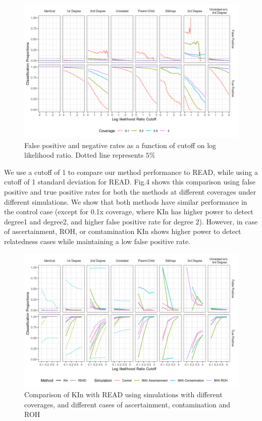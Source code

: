 \documentclass[12pt, letterpaper]{article}
\begin{document}
\begin{figure}[htp]
    \centering
    \includegraphics[width=18cm]{plots/plotimg/contam0_inbred0_model_performance_allroc_asc0_plot.png}
    \caption{False positive and negative rates as a function of cutoff on log likelihood ratio. Dotted line represents $5\%$}
    \label{fig3}
\end{figure}

We use a cutoff of 1 to compare our method performance to READ, while using a cutoff of 1 standard deviation for READ. Fig.4 shows this comparison using false positive and true positive rates for both the methods at different coverages under different simulations. We show that both methods have similar performance in the control case (except for 0.1x coverage, where KIn has higher power to detect degree1 and degree2, and higher false positive rate for degree 2). However, in case of ascertainment, ROH, or comtamination KIn shows higher power to detect relatedness cases while maintaining a low false positive rate. 

\begin{figure}[htp]
    \centering
    \includegraphics[width=18cm]{plots/plotimg/comparison_plot.png}
    \caption{Comparison of KIn with READ using simulations with different coverages, and different cases of ascertainment, contamination and ROH}
    \label{fig4}
\end{figure}
\end{document}
